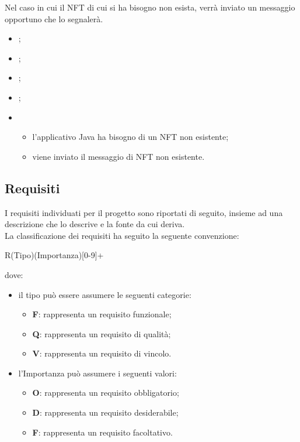 Nel caso in cui il NFT di cui si ha bisogno non esista, verrà inviato un messaggio opportuno che lo segnalerà.

\begin{itemize}
  \item {};
  \item {};
  \item {};
  \item {};
  
  \item \UCMain
  \begin{itemize}
    \item l'applicativo Java ha bisogno di un NFT non esistente;
    \item viene inviato il messaggio di NFT non esistente.
  \end{itemize}
\end{itemize}

\subsection{Requisiti}
I requisiti individuati per il progetto sono riportati di seguito, insieme ad una descrizione che lo descrive e la fonte da cui deriva. \\

\noindent La classificazione dei requisiti ha seguito la seguente convenzione:
\begin{center}
  R(Tipo)(Importanza)[0-9]+
\end{center}
dove:
\begin{itemize}
  \item il tipo può essere assumere le seguenti categorie:
  \begin{itemize}
    \item \textbf{F}: rappresenta un requisito funzionale;
    \item \textbf{Q}: rappresenta un requisito di qualità;
    \item \textbf{V}: rappresenta un requisito di vincolo.
  \end{itemize}

  \item l'Importanza può assumere i seguenti valori:
  \begin{itemize}
    \item \textbf{O}: rappresenta un requisito obbligatorio;
    \item \textbf{D}: rappresenta un requisito desiderabile;
    \item \textbf{F}: rappresenta un requisito facoltativo.
  \end{itemize}
\end{itemize}

